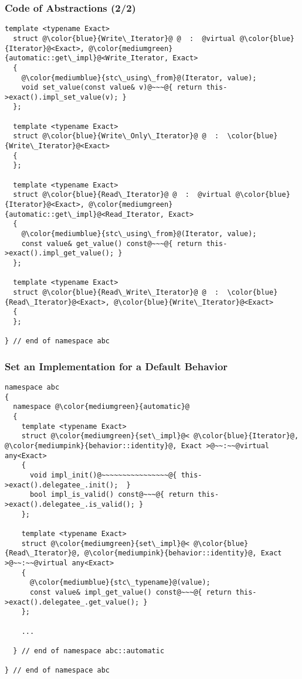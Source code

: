 \begin{frame}[fragile]
  \frametitle{Code of Abstractions (2/2)}

\begin{lstlisting}[escapechar=@,basicstyle={\tiny\sffamily}]
  template <typename Exact>
  struct @\color{blue}{Write\_Iterator}@ @  :  @virtual @\color{blue}{Iterator}@<Exact>, @\color{mediumgreen}{automatic::get\_impl}@<Write_Iterator, Exact>
  {
    @\color{mediumblue}{stc\_using\_from}@(Iterator, value);
    void set_value(const value& v)@~~~@{ return this->exact().impl_set_value(v); }
  };

  template <typename Exact>
  struct @\color{blue}{Write\_Only\_Iterator}@ @  :  \color{blue}{Write\_Iterator}@<Exact>
  {
  };

  template <typename Exact>
  struct @\color{blue}{Read\_Iterator}@ @  :  @virtual @\color{blue}{Iterator}@<Exact>, @\color{mediumgreen}{automatic::get\_impl}@<Read_Iterator, Exact>
  {
    @\color{mediumblue}{stc\_using\_from}@(Iterator, value);
    const value& get_value() const@~~~@{ return this->exact().impl_get_value(); }
  };

  template <typename Exact>
  struct @\color{blue}{Read\_Write\_Iterator}@ @  :  \color{blue}{Read\_Iterator}@<Exact>, @\color{blue}{Write\_Iterator}@<Exact>
  {
  };

} // end of namespace abc
\end{lstlisting}

\end{frame}





\begin{frame}[fragile]
  \frametitle{Set an Implementation for a Default Behavior}


\begin{lstlisting}[escapechar=@,basicstyle={\tiny\sffamily}]
namespace abc
{
  namespace @\color{mediumgreen}{automatic}@
  {
    template <typename Exact>
    struct @\color{mediumgreen}{set\_impl}@< @\color{blue}{Iterator}@, @\color{mediumpink}{behavior::identity}@, Exact >@~~:~~@virtual any<Exact>
    {
      void impl_init()@~~~~~~~~~~~~~~~~@{ this->exact().delegatee_.init();  }
      bool impl_is_valid() const@~~~@{ return this->exact().delegatee_.is_valid(); }
    };

    template <typename Exact>
    struct @\color{mediumgreen}{set\_impl}@< @\color{blue}{Read\_Iterator}@, @\color{mediumpink}{behavior::identity}@, Exact >@~~:~~@virtual any<Exact>
    {
      @\color{mediumblue}{stc\_typename}@(value);
      const value& impl_get_value() const@~~~@{ return this->exact().delegatee_.get_value(); }
    };

    ...

  } // end of namespace abc::automatic

} // end of namespace abc
\end{lstlisting}


\end{frame}



